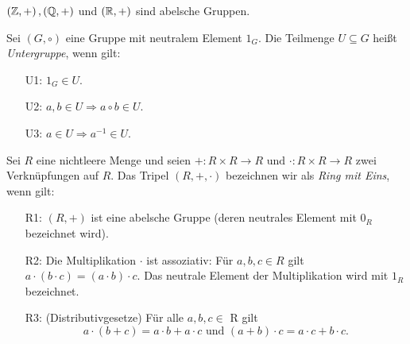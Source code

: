 %
\begin{bsp}
$\left( \mathbb{Z}, +\right), \left(\mathbb{Q}, +\right)$ und $\left(\mathbb{R}, +\right)$ sind abelsche Gruppen. 
\end{bsp}
%
\begin{defn}\label{Untergruppe}
Sei $\left(G, \circ\right)$ eine Gruppe mit neutralem Element $1_G$. Die Teilmenge $U\subseteq G$ heißt \textit{Untergruppe}, wenn gilt:
\begin{enumerate}
\item[U1: ] $1_G \in U$.
\item[U2: ] $a, b \in U \Rightarrow a\circ b \in U$.
\item[U3: ] $a \in U \Rightarrow a^{-1} \in U$.
\end{enumerate} 
\end{defn}


\begin{defn}\label{Ring} %
Sei $R$ eine nichtleere Menge und seien $+ : R \times R \to R \text{ und } \cdot: R \times R \to R $ zwei Verknüpfungen auf $R$. Das Tripel $\left(R, +, \cdot\right)$ bezeichnen wir als \textit{Ring mit Eins}, wenn gilt:
%
\begin{enumerate}
\item[R1: ] $(R, +)$ ist eine abelsche Gruppe (deren neutrales Element mit $0_R$ bezeichnet wird).
\item[R2: ] Die Multiplikation $\cdot$ ist assoziativ: Für $a, b,c \in R$ gilt $a\cdot \left(b \cdot c\right) = \left(a \cdot b \right) \cdot c$. Das neutrale Element der Multiplikation wird mit $1_R$ bezeichnet.%
\item[R3: ] (Distributivgesetze) Für alle $a,b,c \in$ R gilt\\
\[a \cdot(b +c) = a \cdot b + a \cdot c \text{ und }
(a+b) \cdot c = a \cdot c + b \cdot c. \] 
\end{enumerate}
\end{defn}

